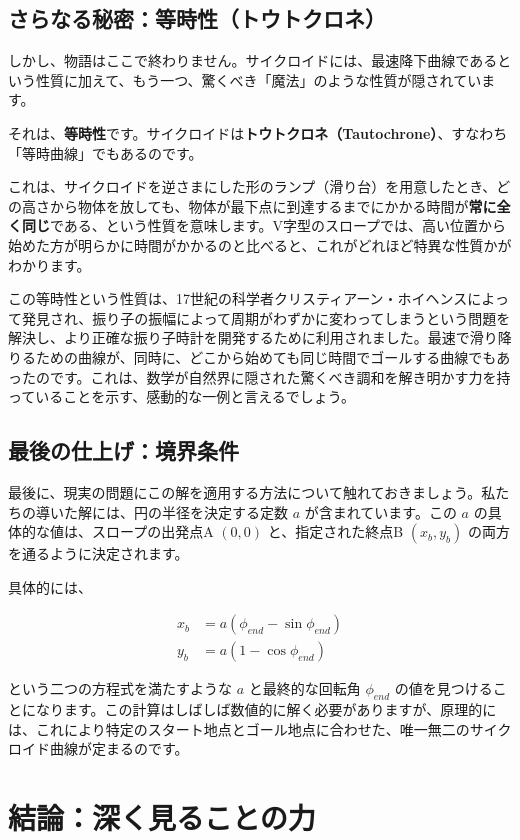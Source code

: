 \documentclass[12pt,a4paper]{ltjsarticle}
\begin{document}
\subsection{さらなる秘密：等時性（トウトクロネ）}

しかし、物語はここで終わりません。サイクロイドには、最速降下曲線であるという性質に加えて、もう一つ、驚くべき「魔法」のような性質が隠されています。

それは、\textbf{等時性}です。サイクロイドは\textbf{トウトクロネ（Tautochrone）}、すなわち「等時曲線」でもあるのです。

これは、サイクロイドを逆さまにした形のランプ（滑り台）を用意したとき、どの高さから物体を放しても、物体が最下点に到達するまでにかかる時間が\textbf{常に全く同じ}である、という性質を意味します。V字型のスロープでは、高い位置から始めた方が明らかに時間がかかるのと比べると、これがどれほど特異な性質かがわかります。

この等時性という性質は、17世紀の科学者クリスティアーン・ホイヘンスによって発見され、振り子の振幅によって周期がわずかに変わってしまうという問題を解決し、より正確な振り子時計を開発するために利用されました。最速で滑り降りるための曲線が、同時に、どこから始めても同じ時間でゴールする曲線でもあったのです。これは、数学が自然界に隠された驚くべき調和を解き明かす力を持っていることを示す、感動的な一例と言えるでしょう。

\subsection{最後の仕上げ：境界条件}

最後に、現実の問題にこの解を適用する方法について触れておきましょう。私たちの導いた解には、円の半径を決定する定数 $a$ が含まれています。この $a$ の具体的な値は、スロープの出発点A $(0,0)$ と、指定された終点B $(x_b, y_b)$ の両方を通るように決定されます。

具体的には、

\begin{align}
x_b &= a(\phi_{end} - \sin\phi_{end}) \\
y_b &= a(1 - \cos\phi_{end})
\end{align}

という二つの方程式を満たすような $a$ と最終的な回転角 $\phi_{end}$ の値を見つけることになります。この計算はしばしば数値的に解く必要がありますが、原理的には、これにより特定のスタート地点とゴール地点に合わせた、唯一無二のサイクロイド曲線が定まるのです。

\section{結論：深く見ることの力}
\end{document}
